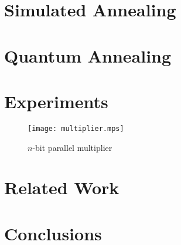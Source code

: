\documentclass{article}
\begin{document}
\section{Simulated Annealing}
\section{Quantum Annealing}
\section{Experiments}
%
\begin{figure}[htb]
\centering
\texttt{[image: multiplier.mps]}
\caption{$n$-bit parallel multiplier\label{fig:multiplier}}
\end{figure}
%
\section{Related Work}
\section{Conclusions}
\end{document}
